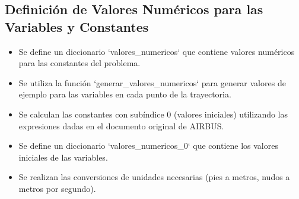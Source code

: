\documentclass[fleqn]{article}
\begin{document}
\subsection{Definición de Valores Numéricos para las Variables y Constantes}




\begin{itemize}

    \item Se define un diccionario `valores\_numericos` que contiene valores numéricos para las constantes del problema. 
    \item Se utiliza la función `generar\_valores\_numericos` para generar valores de ejemplo para las variables en cada punto de la trayectoria. 
    \item Se calculan las constantes con subíndice 0 (valores iniciales) utilizando las expresiones dadas en el documento original de AIRBUS.
    \item Se define un diccionario `valores\_numericos\_0` que contiene los valores iniciales de las variables.
    \item Se realizan las conversiones de unidades necesarias (pies a metros, nudos a metros por segundo).
\end{itemize}
\end{document}
